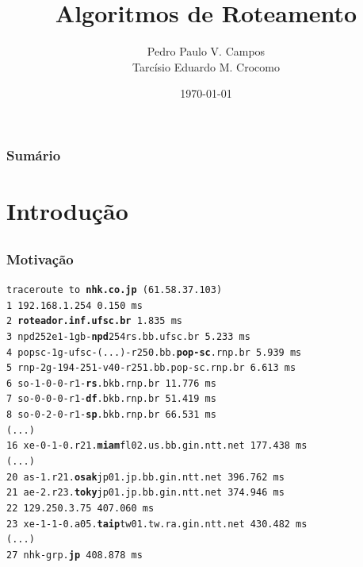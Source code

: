 \documentclass{beamer}
\title{Algoritmos de Roteamento}
\author{Pedro Paulo V. Campos \\ Tarcísio Eduardo M. Crocomo}
\date{\today}
\begin{document}
\begin{frame}
\titlepage
\end{frame}

\begin{frame}
\frametitle{Sumário}
\tableofcontents
\end{frame}


\section{Introdução}
\subsection{}

\begin{frame}
\frametitle{Motivação}
\texttt{\footnotesize traceroute to \textbf{nhk.co.jp} (61.58.37.103) \\
 1  192.168.1.254  0.150 ms \\
 2  \textbf{roteador.inf.ufsc.br}  1.835 ms \\
 3  npd252e1-1gb-\textbf{npd}254rs.bb.ufsc.br  5.233 ms \\
 4  popsc-1g-ufsc-(...)-r250.bb.\textbf{pop-sc}.rnp.br  5.939 ms \\
 5  rnp-2g-194-251-v40-r251.bb.pop-sc.rnp.br  6.613 ms \\
 6  so-1-0-0-r1-\textbf{rs}.bkb.rnp.br  11.776 ms \\
 7  so-0-0-0-r1-\textbf{df}.bkb.rnp.br  51.419 ms \\
 8  so-0-2-0-r1-\textbf{sp}.bkb.rnp.br  66.531 ms \\
(...) \\
16  xe-0-1-0.r21.\textbf{miam}fl02.us.bb.gin.ntt.net 177.438 ms \\
(...) \\
20  as-1.r21.\textbf{osak}jp01.jp.bb.gin.ntt.net  396.762 ms \\
21  ae-2.r23.\textbf{toky}jp01.jp.bb.gin.ntt.net  374.946 ms \\
22  129.250.3.75  407.060 ms \\
23  xe-1-1-0.a05.\textbf{taip}tw01.tw.ra.gin.ntt.net 430.482 ms \\
(...) \\
27  nhk-grp.\textbf{jp}  408.878 ms
}
\end{frame}
\end{document}
